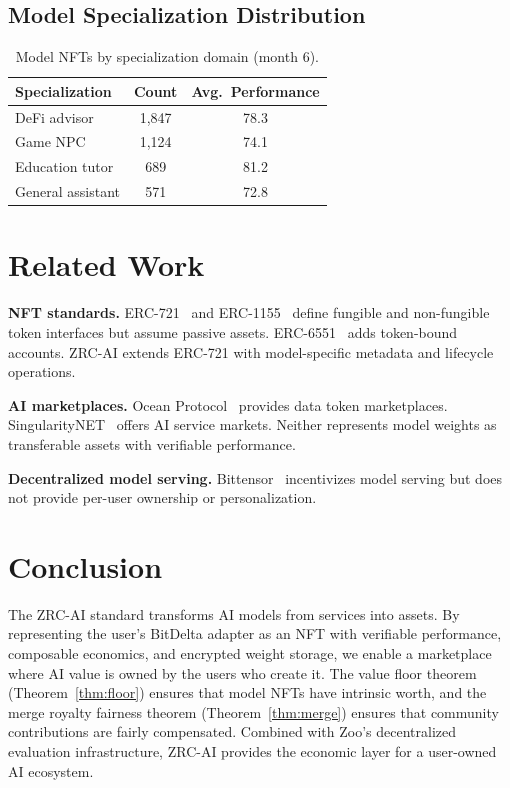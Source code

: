 \documentclass[11pt,letterpaper]{article}
\begin{document}
\subsection{Model Specialization Distribution}

\begin{table}[t]
\centering
\begin{tabular}{lcc}
\toprule
\textbf{Specialization} & \textbf{Count} & \textbf{Avg.\ Performance} \\
\midrule
DeFi advisor & 1,847 & 78.3 \\
Game NPC & 1,124 & 74.1 \\
Education tutor & 689 & 81.2 \\
General assistant & 571 & 72.8 \\
\bottomrule
\end{tabular}
\caption{Model NFTs by specialization domain (month 6).}
\label{tab:specialization}
\end{table}

\section{Related Work}

\textbf{NFT standards.} ERC-721~\cite{entriken2018erc721} and ERC-1155~\cite{radomski2018erc1155} define fungible and non-fungible token interfaces but assume passive assets. ERC-6551~\cite{jayden2023erc6551} adds token-bound accounts. ZRC-AI extends ERC-721 with model-specific metadata and lifecycle operations.

\textbf{AI marketplaces.} Ocean Protocol~\cite{oceanprotocol2019} provides data token marketplaces. SingularityNET~\cite{goertzel2017singularitynet} offers AI service markets. Neither represents model weights as transferable assets with verifiable performance.

\textbf{Decentralized model serving.} Bittensor~\cite{rao2020bittensor} incentivizes model serving but does not provide per-user ownership or personalization.

\section{Conclusion}

The ZRC-AI standard transforms AI models from services into assets. By representing the user's BitDelta adapter as an NFT with verifiable performance, composable economics, and encrypted weight storage, we enable a marketplace where AI value is owned by the users who create it. The value floor theorem (Theorem~\ref{thm:floor}) ensures that model NFTs have intrinsic worth, and the merge royalty fairness theorem (Theorem~\ref{thm:merge}) ensures that community contributions are fairly compensated. Combined with Zoo's decentralized evaluation infrastructure, ZRC-AI provides the economic layer for a user-owned AI ecosystem.
\end{document}
